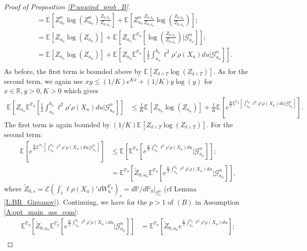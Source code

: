 \documentclass[11pt, letterpaper]{amsart}
\theoremstyle{definition}
\theoremstyle{remark}
\numberwithin{equation}{section}
\newcommand{\reals}{\mathbb R}
\newcommand{\prob}{\mathbb{P}}
\newcommand{\esp}{\mathbb{E}}
\newcommand{\espalt}[2]{\esp^{#1}\bra{#2}}
\newcommand{\G}{\mathcal{G}}
\newcommand{\condespalt}[3]{\esp^{#1}\bra{#2\big| #3}}
\newcommand{\EN}{\mathcal{E}}
\newcommand{\bra}[1]{\left[#1\right]}
\begin{document}
\begin{proof}[Proof of Proposition \ref{P:unwind_prob_B}]
\begin{equation}
\begin{split}
&\quad = \espalt{}{Z^n_{a_n}\log(Z^n_{a_n}) \frac{Z_{0,b_n}}{Z_{0,a_n}}} + \espalt{}{Z^n_{a_n} \frac{Z_{0,b_n}}{Z_{0,a_n}}\log\left(\frac{Z_{0,b_n}}{Z_{0,a_n}}\right)};\\
&\quad = \espalt{}{Z_{a_n}\log\left(Z_{a_n}\right)} + \espalt{}{Z_{a_n}\condespalt{\prob_0}{\log\left(\frac{Z_{0,b_n}}{Z_{0,a_n}}\right)}{\G^n_{a_n}}};\\
&\quad = \espalt{}{Z_{a_n}\log\left(Z_{a_n}\right)} + \espalt{}{Z_{a_n}\condespalt{\prob_0}{\frac{1}{2}\int_{a_n}^{b_n} \ell^2\rho'\rho(X_u)du}{\G^n_{a_n}}}.\\
\end{split}
\end{equation}
As before, the first term is bounded above by $\espalt{}{Z_{\delta \wedge T}\log\left(Z_{\delta\wedge T}\right)}$. As for the second term, we again use $xy\leq (1/K)e^{Kx} + (1/K)y\log(y)$ for $x\in \reals, y>0, K >0$ which gives
\begin{equation*}
\begin{split}
\espalt{}{Z_{a_n}\condespalt{\prob_0}{\frac{1}{2}\int_{a_n}^{b_n} \ell^2\rho'\rho(X_u)du}{\G^n_{a_n}}} &\leq \frac{1}{K}\espalt{}{Z_{a_n}\log\left(Z_{a_n}\right)} + \frac{1}{K}\espalt{}{e^{\frac{K}{2}\condespalt{\prob_0}{\int_{a_n}^{b_n} \ell^2\rho'\rho(X_u)du}{\G^n_{a_n}}}}.
\end{split}
\end{equation*}
The first term is again bounded by $(1/K)\espalt{}{Z_{\delta\wedge T}\log\left(Z_{\delta\wedge T}\right)}$. For the second term:
\begin{equation*}
\begin{split}
\espalt{}{e^{\frac{K}{2}\condespalt{\prob_0}{\int_{a_n}^{b_n} \ell^2\rho'\rho(X_u)du}{\G^n_{a_n}}}} &\leq \espalt{}{\condespalt{\prob_0}{e^{\frac{K}{2}\int_{a_n}^{b_n} \ell^2\rho'\rho(X_u)du}}{\G^n_{a_n}}};\\
&=\espalt{\prob_0}{\check{Z}_{0,a_n} \condespalt{\prob_0}{e^{\frac{K}{2}\int_{a_n}^{b_n} \ell^2\rho'\rho(X_u)du}}{\G^n_{a_n}}},
\end{split}
\end{equation*}
where $\check{Z}_{0,s} = \EN\left(\int_t^\cdot \ell\rho(X_u)'dW^{\prob_0}_u\right)_s = d\prob/d\prob_0\big|_{\G^n_s}$ (cf Lemma \ref{L:BR_Girsanov}). Continuing, we have for the $p>1$ of $(B)$ in Assumption \ref{A:opt_main_ass_com}:
\begin{equation*}
\begin{split}
\espalt{\prob_0}{\check{Z}_{0,a_n} \condespalt{\prob_0}{e^{\frac{K}{2}\int_{a_n}^{b_n} \ell^2\rho'\rho(X_u)du}}{\G^n_{a_n}}} & = \espalt{\prob_0}{\check{Z}_{0,a_n}e^{\frac{K}{2}\int_{a_n}^{b_n} \ell^2\rho'\rho(X_u)du}};\\

\end{split}
\end{equation*}
\end{proof}
\end{document}
